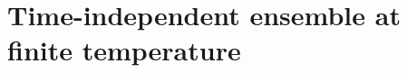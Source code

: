 \documentclass{article}
\theoremstyle{definition}
\begin{document}



\section{Time-independent ensemble at finite temperature}\label{sec:finiteT}
\end{document}
